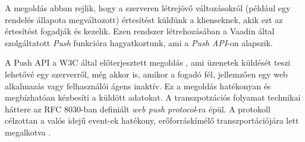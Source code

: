 A megoldás abban rejlik, hogy a szerveren létrejövő változásokról (például egy rendelés állapota megváltozott) értesítést küldünk a klienseknek, akik ezt az értesítést fogadják és kezelik. Ezen rendszer létrehozásában a Vaadin által szolgáltatott \emph{Push} funkcióra hagyatkoztunk, ami a \emph{Push API}-on alapszik. \par

A Push API a W3C által előterjesztett megoldás \cite{Beverloo:22:PA}, ami üzenetek küldését teszi lehetővé egy szerverről, még akkor is, amikor a fogadó fél, jellemzően egy web alkalmazás vagy felhasználói ágens inaktív. Ez a megoldás hatékonyan és megbízhatóan kézbesíti a küldött adatokat. A transzpotzációs folyamat technikai háttere az RFC 8030-ban definiált \emph{web push protocol}-ra épül. A protokoll célzottan a valós idejű event-ek hatékony, erőforráskímélő transzportációjára lett megalkotva \cite{RFC8030}.